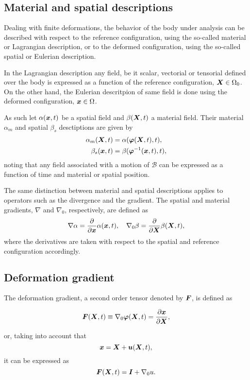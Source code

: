 \subsection{Material and spatial descriptions}

Dealing with finite deformations, the behavior of the body under analysis can be described with respect to the reference configuration, using the so-called material or Lagrangian description, or to the deformed configuration, using the so-called spatial or Eulerian description.

In the Lagrangian description any field, be it scalar, vectorial or tensorial defined over the body is expressed as a function of the reference configuration, $\bm{X} \in \Omega_0$.
On the other hand, the Eulerian descritpion of same field is done using the deformed configuration, $\bm{x}\in \Omega$.

As such let $\alpha(\bm{x},t)$ be a spatial field and $\beta(\bm{X}, t)$ a material field.
Their material $\alpha_m$ and spatial $\beta_s$ desctiptions are given by
\begin{align}
    \alpha_m(\bm{X}, t) &=\alpha(\bm{\varphi}(\bm{X}, t),t),\\
    \beta_s(\bm{x}, t) &= \beta(\bm{\varphi}^{-1}(\bm{x}, t),t),
\end{align}
noting that any field associated with a motion of $\mathscr{B}$ can be expressed as a function of time and material or spatial position.

The same distinction between material and spatial descriptions applies to operators such as the divergence and the gradient.
The spatial and material gradients, $\nabla$ and $\nabla_0$, respectively, are defined as
\begin{equation}
    \nabla \alpha = \frac{\partial}{\partial \bm{x}}\alpha(\bm{x},t),\quad
    \nabla_0 \beta = \frac{\partial}{\partial \bm{X}}\beta (\bm{X}, t),
\end{equation}
where the derivatives are taken with respect to the spatial and reference configuration accordingly.

\subsection{Deformation gradient}

The deformation gradient, a second order tensor denoted by $\bm{F}$, is defined as
\begin{highlight}
    \begin{equation}
            \bm{F}(\bm{X},t)\equiv \nabla_0\bm{\varphi}(\bm{X},t) =\frac{\partial \bm{x}}{\partial \bm{X}},
    \end{equation}
\end{highlight}
or, taking into account that
\begin{equation}
    \bm{x} = \bm{X} + \bm{u}(\bm{X}, t),
\end{equation}
it can be expressed as
\begin{equation}
    \bm{F}(\bm{X}, t) = \bm{I} + \nabla_0 u.
\end{equation}

